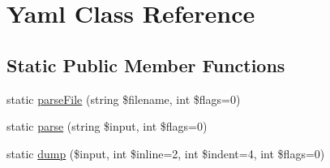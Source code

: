 \hypertarget{class_symfony_1_1_component_1_1_yaml_1_1_yaml}{}\section{Yaml Class Reference}
\label{class_symfony_1_1_component_1_1_yaml_1_1_yaml}
\subsection*{Static Public Member Functions}
\begin{DoxyCompactItemize}
\item 
static \mbox{\hyperlink{class_symfony_1_1_component_1_1_yaml_1_1_yaml_a4948f36005708b9a6a0d9da36c05d810}{parse\+File}} (string \$filename, int \$flags=0)
\item 
static \mbox{\hyperlink{class_symfony_1_1_component_1_1_yaml_1_1_yaml_acb1368e5993339ca9bb58ee95bc49b14}{parse}} (string \$input, int \$flags=0)
\item 
static \mbox{\hyperlink{class_symfony_1_1_component_1_1_yaml_1_1_yaml_a26b0fb9733ab43ce9a9340845e78b7c3}{dump}} (\$input, int \$inline=2, int \$indent=4, int \$flags=0)
\end{DoxyCompactItemize}
